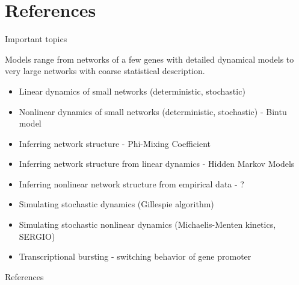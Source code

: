 \documentclass[aspectratio=1610]{beamer}					%
\begin{document}
\section{References}

\begin{frame}{Important topics}

Models range from networks of a few genes with detailed dynamical models to very large networks with coarse statistical description.
\vspace{0.2in}

\begin{itemize}
\item Linear dynamics of small networks (deterministic, stochastic)
\item Nonlinear dynamics of small networks (deterministic, stochastic) - Bintu model
\item Inferring network structure - Phi-Mixing Coefficient
\item Inferring network structure from linear dynamics - Hidden Markov Models
\item Inferring nonlinear network structure from empirical data - ?
\item Simulating stochastic dynamics (Gillespie algorithm)
\item Simulating stochastic nonlinear dynamics (Michaelis-Menten kinetics, SERGIO)
\item Transcriptional bursting - switching behavior of gene promoter
\end{itemize}


\end{frame}

\begin{frame}[allowframebreaks]{References}
	\tiny
	
\end{frame}
\end{document}
